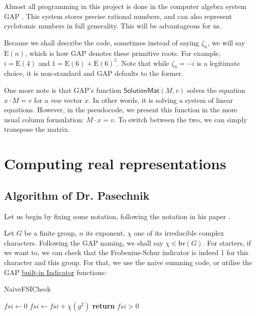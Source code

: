 \documentclass[11pt]{article}
\begin{document}
Almost all programming in this project is done in the computer algebra system GAP
\cite{GAP4}. This system stores precise rational numbers, and can also represent
cyclotomic numbers in full generality. This will be advantageous for us.

Because we shall describe the code, sometimes instead of saying $\zeta_n$, we
will say $\text{E}(n)$, which is how GAP denotes these primitive roots. For
example, $i = \text{E}(4)$ and $1 = \text{E}(6) + \text{E}(6)^5$. Note that while
$\zeta_4 = -i$ is a legitimate choice, it is non-standard and GAP defaults
to the former.

One more note is that GAP's function $\textsf{SolutionMat}(M, v)$ solves the equation
$x \cdot M = v$ for a \textit{row} vector $x$. In other words, it is solving a system
of linear equations. However, in the pseudocode, we present this function in the
more usual column formulation: $M \cdot x = v$. To switch between
the two, we can simply transpose the matrix.

\newpage

\section{Computing real representations}

\subsection{Algorithm of Dr. Pasechnik} \label{sec:alg}

Let us begin by fixing some notation, following the notation in his paper \cite{Pas21}.

Let $G$ be a finite group, $n$ its exponent, $\chi$ one of its irreducible complex characters. 
Following the GAP naming, we shall say $\chi \in \textsf{Irr}(G)$. For starters, if we want to,
we can check that the Frobenius-Schur indicator is indeed $1$ for this character and this group.
For that, we use the naive summing code, or utilise the GAP
\href{https://docs.gap-system.org/doc/ref/chap71_mj.html#X7FD3D3047DE6381E}{built-in Indicator} functions:

\begin{algorithm}
  \caption{NaiveFSICheck}
  \begin{algorithmic}
    \State $fsi \gets 0$
      \State $fsi \gets fsi + \chi(g^2)$
    \EndFor
    \State \textbf{return} $fsi > 0$
  \end{algorithmic}
\end{algorithm}
\end{document}

